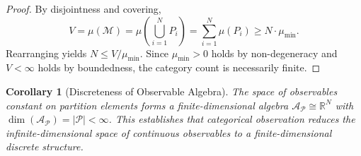 \documentclass[twocolumn,10pt,a4paper]{article}
\newtheorem{corollary}[theorem]{Corollary}
\theoremstyle{remark}
\newcommand{\manifold}{\mathcal{M}}
\newcommand{\partition}{\mathcal{P}}
\newcommand{\Reals}{\mathbb{R}}
\begin{document}
\begin{proof}
By disjointness and covering,
\begin{equation}
V = \mu(\manifold) = \mu\left(\bigcup_{i=1}^N P_i\right) = \sum_{i=1}^N \mu(P_i) \geq N \cdot \mu_{\min}.
\end{equation}
Rearranging yields $N \leq V / \mu_{\min}$. Since $\mu_{\min} > 0$ holds by non-degeneracy and $V < \infty$ holds by boundedness, the category count is necessarily finite.
\end{proof}

\begin{corollary}[Discreteness of Observable Algebra]
\label{cor:discrete_algebra}
The space of observables constant on partition elements forms a finite-dimensional algebra $\mathcal{A}_\partition \cong \Reals^N$ with $\dim(\mathcal{A}_\partition) = |\partition| < \infty$. This establishes that categorical observation reduces the infinite-dimensional space of continuous observables to a finite-dimensional discrete structure.
\end{corollary}
\end{document}
